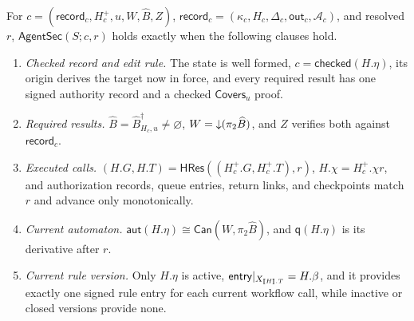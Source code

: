 \begin{definition}
\label{def:agent-sec}
For \(c=(\mathsf{record}_c,H_c^+,u,W,\widehat B,Z)\), \(\mathsf{record}_c=(\kappa_c,H_c,\Delta_c,\mathsf{out}_c,\mathcal A_c)\), and resolved \(r\), \(\mathsf{AgentSec}(S;c,r)\) holds exactly when the following clauses hold.
\begin{enumerate}[leftmargin=*,itemsep=0pt,topsep=1pt]
\item \emph{Checked record and edit rule.}
The state is well formed, \(c=\mathsf{checked}(H.\eta)\), its origin derives the target now in force, and every required result has one signed authority record and a checked \(\mathsf{Covers}_u\) proof.
\item \emph{Required results.}
\(\widehat B=\widehat B^\dagger_{H_c,u}\ne\varnothing\), \(W=\mathord{\downarrow}(\pi_2\widehat B)\), and \(Z\) verifies both against \(\mathsf{record}_c\).
\item \emph{Executed calls.}
\((H.G,H.T)=\mathsf{HRes}((H_c^+.G,H_c^+.T),r)\), \(H.\chi=H_c^+.\chi r\), and authorization records, queue entries, return links, and checkpoints match \(r\) and advance only monotonically.
\item \emph{Current automaton.}
\(\mathsf{aut}(H.\eta)\cong\mathsf{Can}(W,\pi_2\widehat B)\), and \(\mathsf q(H.\eta)\) is its derivative after \(r\).
\item \emph{Current rule version.}
Only \(H.\eta\) is active, \(\mathsf{entry}|_{X_{\mathopen{[\![}H\mathclose{]\!]}.T}}=H.\beta\), and it provides exactly one signed rule entry for each current workflow call, while inactive or closed versions provide none.
\end{enumerate}
\end{definition}

